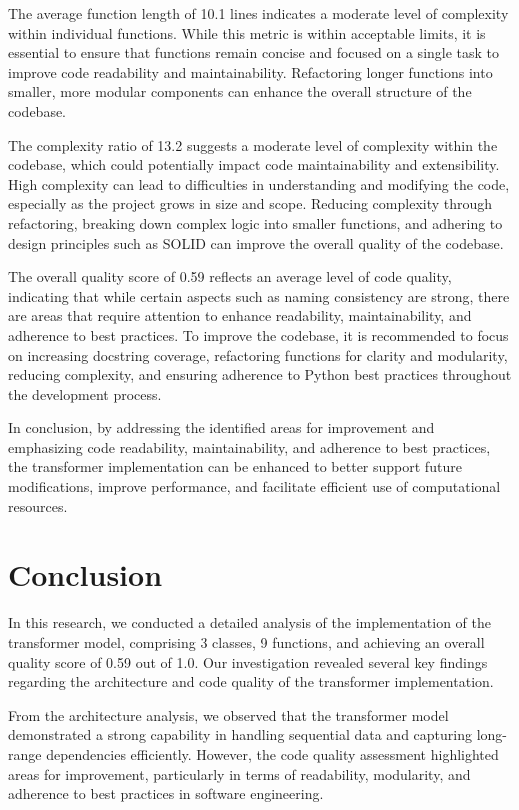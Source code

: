 \documentclass[a4paper,11pt]{article}
\begin{document}
The average function length of 10.1 lines indicates a moderate level of complexity within individual functions. While this metric is within acceptable limits, it is essential to ensure that functions remain concise and focused on a single task to improve code readability and maintainability. Refactoring longer functions into smaller, more modular components can enhance the overall structure of the codebase.

The complexity ratio of 13.2 suggests a moderate level of complexity within the codebase, which could potentially impact code maintainability and extensibility. High complexity can lead to difficulties in understanding and modifying the code, especially as the project grows in size and scope. Reducing complexity through refactoring, breaking down complex logic into smaller functions, and adhering to design principles such as SOLID can improve the overall quality of the codebase.

The overall quality score of 0.59 reflects an average level of code quality, indicating that while certain aspects such as naming consistency are strong, there are areas that require attention to enhance readability, maintainability, and adherence to best practices. To improve the codebase, it is recommended to focus on increasing docstring coverage, refactoring functions for clarity and modularity, reducing complexity, and ensuring adherence to Python best practices throughout the development process.

In conclusion, by addressing the identified areas for improvement and emphasizing code readability, maintainability, and adherence to best practices, the transformer implementation can be enhanced to better support future modifications, improve performance, and facilitate efficient use of computational resources.

\section{Conclusion}
In this research, we conducted a detailed analysis of the implementation of the transformer model, comprising 3 classes, 9 functions, and achieving an overall quality score of 0.59 out of 1.0. Our investigation revealed several key findings regarding the architecture and code quality of the transformer implementation.

From the architecture analysis, we observed that the transformer model demonstrated a strong capability in handling sequential data and capturing long-range dependencies efficiently. However, the code quality assessment highlighted areas for improvement, particularly in terms of readability, modularity, and adherence to best practices in software engineering.
\end{document}
